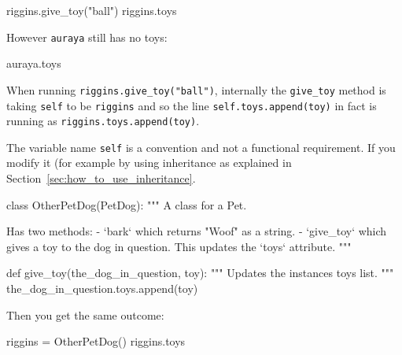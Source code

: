 \begin{pyin}
riggins.give_toy("ball")
riggins.toys
\end{pyin}





\begin{raw}
['ball']
\end{raw}

However \texttt{auraya} still has no toys:

\begin{pyin}
auraya.toys
\end{pyin}





\begin{raw}
[]
\end{raw}





When running \texttt{riggins.give\_toy("ball")}, internally the \texttt{give\_toy} method is
taking \texttt{self} to be \texttt{riggins} and so the
line \texttt{self.toys.append(toy)} in fact is running as \texttt{riggins.toys.append(toy)}.


The variable name \texttt{self} is a convention and not a functional requirement.
If you modify it
(for example by using inheritance as explained in
Section~\ref{sec:how_to_use_inheritance}.




\begin{pyin}
class OtherPetDog(PetDog):
    """
    A class for a Pet.

    Has two methods:
        - `bark` which returns "Woof" as a string.
        - `give_toy` which gives a toy to the dog in question. This updates the
          `toys` attribute.
    """

    def give_toy(the_dog_in_question, toy):
        """
        Updates the instances toys list.
        """
        the_dog_in_question.toys.append(toy)
\end{pyin}





Then you get the same outcome:




\begin{pyin}
riggins = OtherPetDog()
riggins.toys
\end{pyin}





